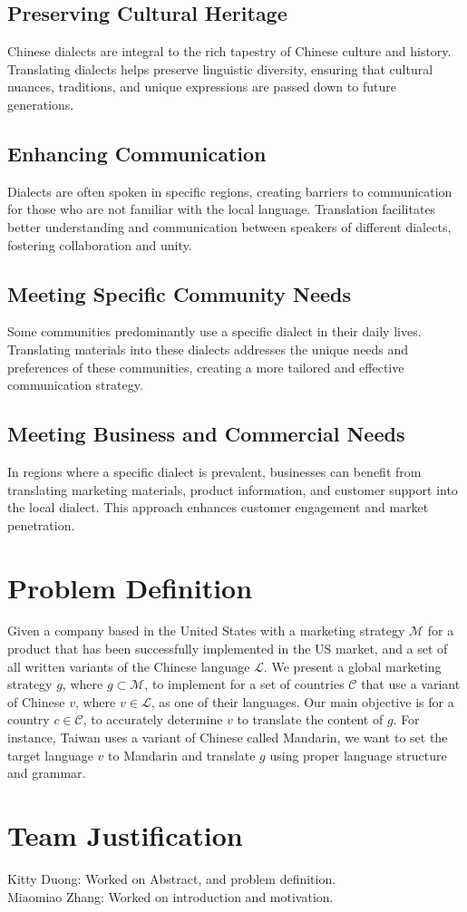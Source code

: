 \documentclass[sigconf]{acmart}
\begin{document}
\subsection{Preserving Cultural Heritage}
Chinese dialects are integral to the rich tapestry of Chinese culture and history. Translating dialects helps preserve linguistic diversity, ensuring that cultural nuances, traditions, and unique expressions are passed down to future generations.

\subsection{Enhancing Communication}
Dialects are often spoken in specific regions, creating barriers to communication for those who are not familiar with the local language. Translation facilitates better understanding and communication between speakers of different dialects, fostering collaboration and unity.

\subsection{Meeting Specific Community Needs}
Some communities predominantly use a specific dialect in their daily lives. Translating materials into these dialects addresses the unique needs and preferences of these communities, creating a more tailored and effective communication strategy.

\subsection{Meeting Business and Commercial Needs}
In regions where a specific dialect is prevalent, businesses can benefit from translating marketing materials, product information, and customer support into the local dialect. This approach enhances customer engagement and market penetration.

\section{Problem Definition}
Given a company based in the United States with a marketing strategy $\mathcal{M}$ for a product that has been successfully implemented in the US market, and a set of all written variants of the Chinese language $\mathcal{L}$. We present a global marketing strategy $g$, where $g \subset \mathcal{M}$, to implement for a set of countries $\mathcal{C}$ that use a variant of Chinese $v$, where $v \in \mathcal{L}$, as one of their languages. Our main objective is for a country $c \in \mathcal{C}$, to accurately determine $v$ to translate the content of $g$. For instance, Taiwan uses a variant of Chinese called Mandarin, we want to set the target language $v$ to Mandarin and translate $g$ using proper language structure and grammar.

\section{Team Justification}
Kitty Duong: Worked on Abstract, and problem definition.\\
Miaomiao Zhang: Worked on introduction and motivation.
\end{document}
